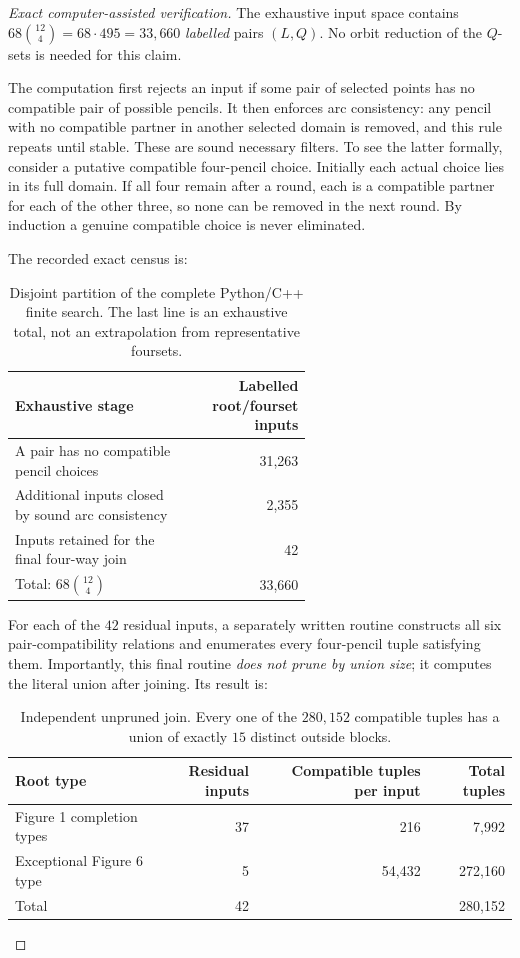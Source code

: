 \documentclass[11pt]{article}
\newcommand{\bin}[2]{\binom{#1}{#2}}
\theoremstyle{definition}
\theoremstyle{remark}
\begin{document}
\begin{proof}[Exact computer-assisted verification]
The exhaustive input space contains
$68\bin{12}{4}=68\cdot495=33{,}660$ \emph{labelled} pairs $(L,Q)$.
No orbit reduction of the $Q$-sets is needed for this claim.

The computation first rejects an input if some pair of selected points
has no compatible pair of possible pencils. It then enforces arc
consistency: any pencil with no compatible partner in another
selected domain is removed, and this rule repeats until stable.
These are sound necessary filters. To see the latter formally,
consider a putative compatible four-pencil choice. Initially each
actual choice lies in its full domain. If all four remain after a
round, each is a compatible partner for each of the other three,
so none can be removed in the next round. By induction a genuine
compatible choice is never eliminated.

The recorded exact census is:
\begin{table}[ht]
\centering\small
\begin{tabular}{@{}p{0.59\linewidth}r@{}}
\toprule
Exhaustive stage & Labelled root/fourset inputs \\
\midrule
A pair has no compatible pencil choices & 31,263\\
Additional inputs closed by sound arc consistency & 2,355\\
Inputs retained for the final four-way join & 42\\
\midrule
Total: $68\bin{12}{4}$ & 33,660\\
\bottomrule
\end{tabular}
\caption{Disjoint partition of the complete Python/C++ finite search.
The last line is an exhaustive total, not an extrapolation from
representative foursets.}\label{tab:filter}
\end{table}

For each of the $42$ residual inputs, a separately written routine
constructs all six pair-compatibility relations and enumerates every
four-pencil tuple satisfying them. Importantly, this final routine
\emph{does not prune by union size}; it computes the literal union
after joining. Its result is:
\begin{table}[ht]
\centering\small
\begin{tabular}{@{}lrrr@{}}
\toprule
Root type & Residual inputs & Compatible tuples per input
 & Total tuples \\
\midrule
Figure 1 completion types & 37 & 216 & 7,992\\
Exceptional Figure 6 type & 5 & 54,432 & 272,160\\
\midrule
Total & 42 & & 280,152\\
\bottomrule
\end{tabular}
\caption{Independent unpruned join. Every one of the $280{,}152$
compatible tuples has a union of exactly $15$ distinct outside blocks.}
\label{tab:join}
\end{table}


\end{proof}
\end{document}
